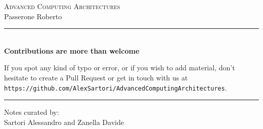 \documentclass[a4paper]{report}
\begin{document}
\begin{center}
    \begin{figure}[h!]
        \centerline{}
    \end{figure}
    \vspace{2 cm}
    \Huge\textsc{Advanced Computing Architectures\\}
    \vspace{1 cm}
    \large{Passerone Roberto\\}
    \vspace{2 cm}
    
    \noindent\rule{12cm}{0.4pt} \\
        \medskip
        \textbf{Contributions are more than welcome} \medskip
        
        \small{If you spot any kind of typo or error, or if you wish to add material, don't hesitate to create a Pull Request or get in touch with us at \texttt{https://github.com/AlexSartori/AdvancedComputingArchitectures}.}
        \bigskip
    \noindent\rule{12cm}{0.4pt}
    
    \vspace{3 cm}
    \large{Notes curated by:\\Sartori Alessandro and Zanella Davide}
\end{center}

\clearpage

\tableofcontents










\end{document}
